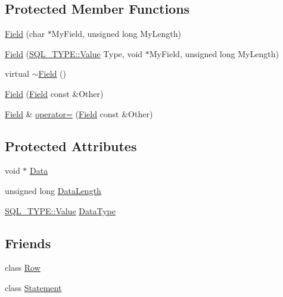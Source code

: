 \subsection*{Protected Member Functions}
\begin{DoxyCompactItemize}
\item 
\hyperlink{class_field_ab87dbfd0f9f0bbc72575d9723adfcd10}{Field} (char $\ast$My\+Field, unsigned long My\+Length)
\item 
\hyperlink{class_field_a2c107d46631d5170e480d8c80b19dda8}{Field} (\hyperlink{struct_s_q_l___t_y_p_e_a2ad43c0413d655b655c3b5ca694d1963}{S\+Q\+L\+\_\+\+T\+Y\+P\+E\+::\+Value} Type, void $\ast$My\+Field, unsigned long My\+Length)
\item 
virtual \hyperlink{class_field_a45d6e6d09b8f8e46de62b40119d62c60}{$\sim$\+Field} ()
\item 
\hyperlink{class_field_a2b4e860e3b06eaa5099a13efe50cc7df}{Field} (\hyperlink{class_field}{Field} const \&Other)
\item 
\hyperlink{class_field}{Field} \& \hyperlink{class_field_a011a8dc1a8f459e83070f46edd24637c}{operator=} (\hyperlink{class_field}{Field} const \&Other)
\end{DoxyCompactItemize}
\subsection*{Protected Attributes}
\begin{DoxyCompactItemize}
\item 
void $\ast$ \hyperlink{class_field_ae62c758ab217b45f212c11e972456c12}{Data}
\item 
unsigned long \hyperlink{class_field_ab26af1e23e7541bb670cbef08b29b9b4}{Data\+Length}
\item 
\hyperlink{struct_s_q_l___t_y_p_e_a2ad43c0413d655b655c3b5ca694d1963}{S\+Q\+L\+\_\+\+T\+Y\+P\+E\+::\+Value} \hyperlink{class_field_ae4f24cedb1919b2f045c738706a55d22}{Data\+Type}
\end{DoxyCompactItemize}
\subsection*{Friends}
\begin{DoxyCompactItemize}
\item 
class \hyperlink{class_field_a830c9c8d43a693758fe4e27a31156fa1}{Row}
\item 
class \hyperlink{class_field_adab6e13caeb507948d0ee0b059b1a1af}{Statement}
\end{DoxyCompactItemize}


